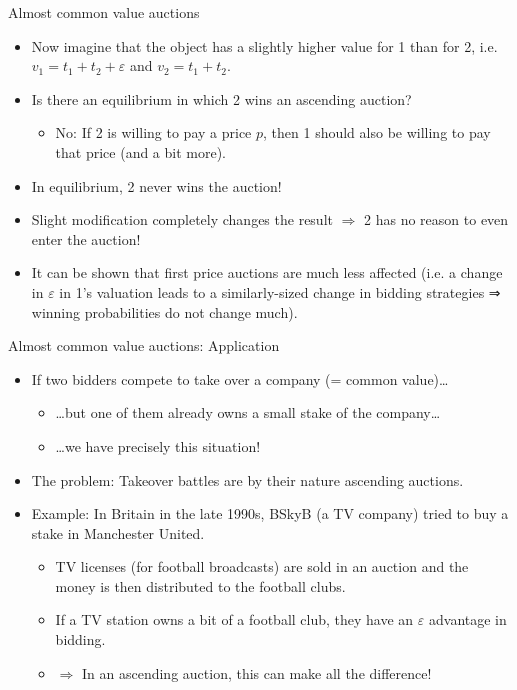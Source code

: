 \documentclass[bigger]{beamer}
\newcommand{\Ra}{\Rightarrow} \newcommand{\ra}{\rightarrow} \newcommand{\Lra}{\Leftrightarrow}
\begin{document}
\begin{frame}[label={sec:orgac030c3}]{Almost common value auctions}
\begin{itemize}
\item Now imagine that the object has a slightly higher value for 1 than for 2, i.e. \(v_ 1 = t_ 1 + t_ 2 + \varepsilon\) and \(v_ 2 = t_ 1 + t_ 2\).
\item Is there an equilibrium in which 2 wins an ascending auction?
\begin{itemize}
\item No: If 2 is willing to pay a price \(p\), then 1 should also be willing to pay that price (and a bit more).
\end{itemize}
\item In equilibrium, 2 never wins the auction!
\item Slight modiﬁcation completely changes the result \(\Ra\) 2 has no reason to even enter the auction!
\item It can be shown that first price auctions are much less affected (i.e. a change in \(\varepsilon\) in 1’s valuation leads to a similarly-sized change in bidding strategies ⇒ winning probabilities do not change much).
\end{itemize}
\end{frame}

\begin{frame}[label={sec:org870d356}]{Almost common value auctions: Application}
\begin{itemize}
\item If two bidders compete to take over a company (= common value)\ldots{}
\begin{itemize}
\item \ldots{}but one of them already owns a small stake of the company\ldots{}
\item \ldots{}we have precisely this situation!
\end{itemize}
\item The problem: Takeover battles are by their nature ascending auctions.
\item Example: In Britain in the late 1990s, BSkyB (a TV company) tried to buy a stake in Manchester United.
\begin{itemize}
\item TV licenses (for football broadcasts) are sold in an auction and the money is then distributed to the football clubs.
\item If a TV station owns a bit of a football club, they have an \(\varepsilon\) advantage in bidding.
\item \(\Ra\) In an ascending auction, this can make all the difference!
\end{itemize}
\end{itemize}
\end{frame}
\end{document}
